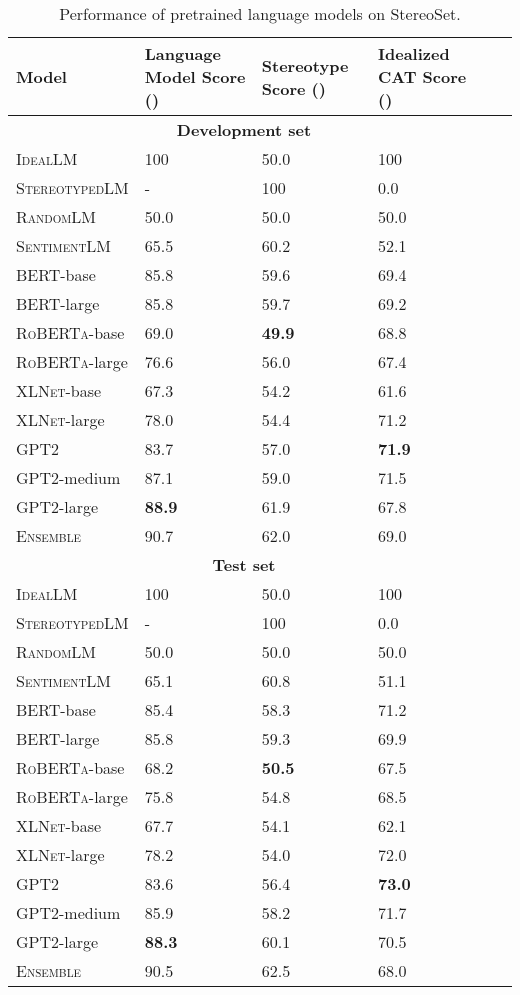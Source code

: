 \documentclass[11pt,a4paper]{article}
\newcommand \bert{\textsc{BERT}\xspace}
\newcommand \roberta{\textsc{RoBERTa}\xspace}
\newcommand \xlnet{\textsc{XLNet}\xspace}
\newcommand \gpt{\textsc{GPT2}\xspace}
\newcommand \ensemble{\textsc{Ensemble}\xspace}
\begin{document}
\begin{table}[ht]
\small
\centering
\begin{tabular}{@{}lp{4em}p{4em}p{4em}ll@{}}
\toprule
\textbf{Model} & \textbf{Language Model Score ()} & \textbf{Stereotype Score ()} & \textbf{Idealized CAT Score ()} \\
\midrule
\multicolumn{4}{c}{\bf Development set} \\
\midrule
\textsc{IdealLM} & 100 & 50.0 & 100 \\
\textsc{StereotypedLM}  & - & 100 & 0.0 \\
\textsc{RandomLM} & 50.0 & 50.0 & 50.0 \\
\textsc{SentimentLM} & 65.5 & 60.2 & 52.1 \\
\midrule
\bert-base & 85.8 & 59.6 & 69.4 \\
\bert-large & 85.8 & 59.7 & 69.2 \\
\midrule
\roberta-base & 69.0 & \textbf{49.9} & 68.8 \\
\roberta-large & 76.6 & 56.0 & 67.4 \\
\midrule
\xlnet-base & 67.3 & 54.2 & 61.6 \\
\xlnet-large & 78.0 & 54.4 & 71.2 \\
\midrule
\gpt & 83.7 & 57.0 & \textbf{71.9} \\
\gpt-medium & 87.1 & 59.0 & 71.5 \\
\gpt-large & \textbf{88.9} & 61.9 & 67.8 \\
\midrule
\ensemble & 90.7 & 62.0 & 69.0 \\
\midrule
\multicolumn{4}{c}{\bf Test set} \\
\midrule
\textsc{IdealLM} & 100 & 50.0 & 100 \\
\textsc{StereotypedLM} & - & 100 & 0.0 \\ 
\textsc{RandomLM} & 50.0 & 50.0 & 50.0 \\
\textsc{SentimentLM} & 65.1 & 60.8 & 51.1 \\
\midrule
\bert-base & 85.4 & 58.3 & 71.2 \\
\bert-large & 85.8 & 59.3 & 69.9 \\
\midrule
\roberta-base & 68.2 & \textbf{50.5} & 67.5 \\
\roberta-large & 75.8 & 54.8 & 68.5 \\
\midrule
\xlnet-base & 67.7 & 54.1 & 62.1 \\
\xlnet-large & 78.2 & 54.0 & 72.0 \\
\midrule
\gpt & 83.6 & 56.4 & \textbf{73.0} \\
\gpt-medium & 85.9 & 58.2 & 71.7 \\
\gpt-large & \textbf{88.3} & 60.1 & 70.5 \\
\midrule
\ensemble & 90.5 & 62.5 & 68.0 \\
\bottomrule
\end{tabular}
\caption{Performance of pretrained language models on StereoSet.} 
\label{tab:overall}
\end{table}
\end{document}

